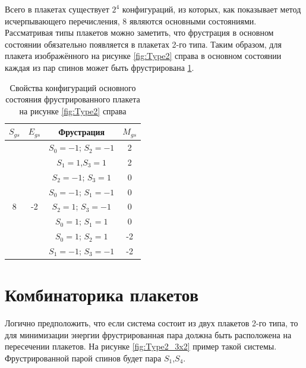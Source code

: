 \documentclass[utf8, babel, sor, jor, amsmath, amssymb, reprint]{elsarticle} %
\begin{document}
Всего в плакетах существует $2^4$ конфигураций, из которых, как показывает метод исчерпывающего перечисления, 8 являются основными состояниями. 
Рассматривая типы плакетов можно заметить, что фрустрация в основном состоянии обязательно появляется в плакетах 2-го типа. 
Таким образом, для плакета изображённого на рисунке \ref{fig:Type2} справа в основном состоянии каждая из пар спинов может быть фрустрирована \ref{tab:Strunags}.

\begin{table}[H]
		\centering
	\begin{tabular}{|c|c|c|c|}
	
		\hline
	 $S_{gs}$	& $E_{gs}$    & Фрустрация  &   $M_{gs}$   \\
	\hline
	    & & 	$S_0=-1$; $S_2=-1$ & 2   \\ 	\cline{3-4}
	   	& & $S_1=1$,$S_3=1$        & 2\\ 	\cline{3-4}
		& &  $S_2=-1$; $S_3=1$     & 0    \\ \cline{3-4} 
        &  & $S_0=-1$; $S_1=-1$ &	0  \\ 
		\cline{3-4} 
		8	\multirow{3}{*}{} & -2 \multirow{3}{*}{} & $S_2=1$;  $S_3=-1$     &  0\\ \cline{3-4}	
		& & $S_0=1$;  $S_1=1$      &  0\\ \cline{3-4}
		& &	$S_0=1$;  $S_2=1$      &  -2\\ \cline{3-4}
		& &	$S_1=-1$; $S_3=-1$     & -2\\ \hline
	
	\end{tabular}
	\caption{Свойства конфигураций основного состояния фрустрированного плакета на рисунке \ref{fig:Type2} справа}
	\label{tab:Strunags}
\end{table}

\section{Комбинаторика плакетов}
  
Логично предположить, что если система состоит из двух плакетов 2-го типа, то для минимизации энергии фрустрированная пара должна быть расположена на пересечении плакетов. На рисунке \ref{fig:Type2_3x2} пример такой системы. Фрустрированной парой спинов будет пара $S_1$,$S_4$.
\end{document}
